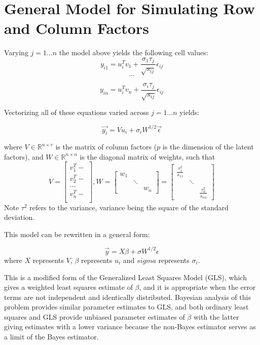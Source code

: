 \documentclass[12pt,twoside]{dukestatscithesis}
\theoremstyle{definition}
\theoremstyle{definition}
\theoremstyle{definition}
\theoremstyle{remark}
\begin{document}
\section{General Model for Simulating Row and Column
Factors}\label{general-model-for-simulating-row-and-column-factors}

Varying \(j = 1 ... n\) the model above yields the following cell
values:
\[y_{i1} = u_i^Tv_1 + \frac{\sigma_1 \tau_j}{\sqrt{s_{ij}}}\epsilon_{ij}\]
\[ ... \]

\[ y_{in} = u_i^Tv_n + \frac{\sigma_i \tau_j}{\sqrt{s_{ij}}}\epsilon_{ij} \]

Vectorizing all of these equations varied across \(j = 1...n\) yields:

\[\vec{y_i} = Vu_i + \sigma_i W^{1/2}\vec{\epsilon}\]

where \(V \in \mathbb{R}^{n \times r}\) is the matrix of column factors
(\(p\) is the dimension of the latent factors), and
\(W \in \mathbb{R}^{n \times n}\) is the diagonal matrix of weights,
such that \[V =
  \begin{bmatrix}
    v_1^T- \\
    v_2^T- \\
    ... \\
    v_n^T- \\
  \end{bmatrix},
  W =
  \begin{bmatrix}
    w_{1} & & \\
    & \ddots & \\
    & & w_{n}
  \end{bmatrix} 
  = \begin{bmatrix}
    \frac{\tau_1^2}{s_{11}} & & \\
    & \ddots & \\
    & & \frac{\tau_n^2}{s_{nn}}
  \end{bmatrix}\]
Note \(\tau^2\) refers to the variance, variance being the square of the
standard deviation.

This model can be rewritten in a general form:

\[\vec{y} = X\beta + \sigma W^{1/2}\epsilon\] where \(X\) represents
\(V\), \(\beta\) represents \(u_i\) and \(sigma\) represents
\(\sigma_i\).

This is a modified form of the Generalized Least Squares Model (GLS),
which gives a weighted least squares estimate of \(\beta\), and it is
appropriate when the error terms are not independent and identically
distributed. Bayesian analysis of this problem provides similar
parameter estimates to GLS, and both ordinary least squares and GLS
provide unbiased parameter estimates of \(\beta\) with the latter giving
estimates with a lower variance because the non-Bayes estimator serves
as a limit of the Bayes estimator.
\end{document}
